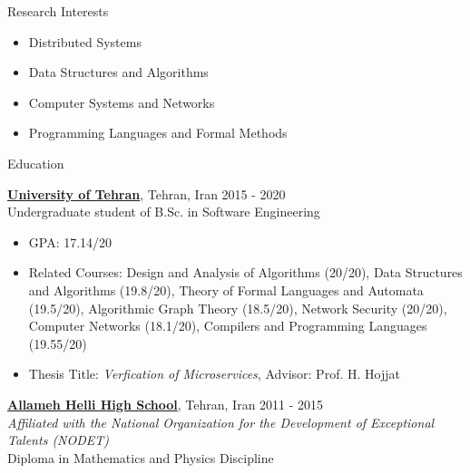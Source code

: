 \documentclass{resume} %
\begin{document}
	

\begin{rSection}{Research Interests}
	\begin{multicols}{2}
		\begin{itemize}[leftmargin=0mm]
			\item Distributed Systems
			\item Data Structures and Algorithms
			\item Computer Systems and Networks
			\item Programming Languages and Formal Methods
		\end{itemize}
	\end{multicols}
\end{rSection}


\begin{rSection}{Education}
	
	{\bf \href{http://ut.ac.ir/en}{University of Tehran}}, Tehran, Iran \hfill 2015 - 2020 
	\\Undergraduate student of B.Sc. in Software Engineering
	
	\begin{itemize}
		\item GPA: 17.14/20 
		\item Related Courses: Design and Analysis of Algorithms (20/20), Data Structures and Algorithms (19.8/20),
		Theory of Formal Languages and Automata (19.5/20), Algorithmic Graph Theory (18.5/20), Network Security (20/20), Computer Networks (18.1/20), Compilers and Programming Languages (19.55/20)
        \item Thesis Title: \textit{Verfication of Microservices}, Advisor: Prof. H. Hojjat
	\end{itemize}
	
	{\bf \href{http://www.helli.ir/}{Allameh Helli High School}}, Tehran, Iran \hfill 2011 - 2015
	\\\textit{\scriptsize Affiliated with the National Organization for the Development of Exceptional Talents (NODET)}
	\\Diploma in Mathematics and Physics Discipline
	
\end{rSection}
\end{document}
